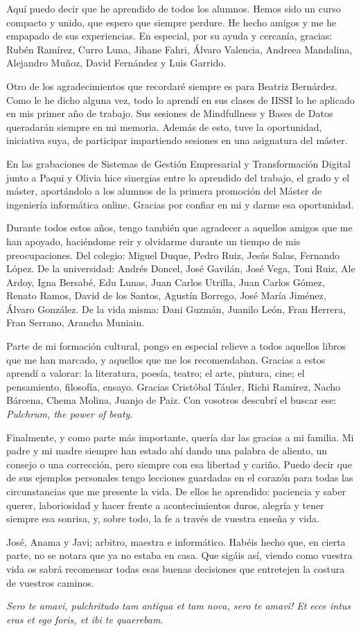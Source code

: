 Aquí puedo decir que he aprendido de todos los alumnos. Hemos sido un curso compacto y unido, que espero que siempre perdure. He hecho amigos y me he empapado de sus experiencias. En especial, por su ayuda y cercanía, gracias: Rubén Ramírez, Curro Luna, Jihane Fahri, Álvaro Valencia, Andreea Mandalina, Alejandro Muñoz, David Fernández y Luis Garrido.

Otro de los agradecimientos que recordaré siempre es para Beatriz Bernárdez. Como le he dicho alguna vez, todo lo aprendí en sus clases de IISSI lo he aplicado en mis primer año de trabajo. Sus sesiones de Mindfullness y Bases de Datos queradarán siempre en mi memoria. Además de esto, tuve la oportunidad, iniciativa suya, de participar impartiendo sesiones en una asignatura del máster.

En las grabaciones de Sistemas de Gestión Empresarial y Transformación Digital junto a Paqui y Olivia hice sinergias entre lo aprendido del trabajo, el grado y el máster, aportándolo a los alumnos de la primera promoción del Máster de ingeniería informática online. Gracias por confiar en mi y darme esa oportunidad.

Durante todos estos años, tengo también que agradecer a aquellos amigos que me han apoyado, haciéndome reir y olvidarme durante un tiempo de mis preocupaciones. Del colegio: Miguel Duque, Pedro Ruiz, Jesús Salas, Fernando López. De la universidad: Andrés Doncel, José Gavilán, José Vega, Toni Ruiz, Ale Ardoy, Igna Bersabé, Edu Lunas, Juan Carlos Utrilla, Juan Carlos Gómez, Renato Ramos, David de los Santos, Agustín Borrego, José María Jiménez, Álvaro González. De la vida misma: Dani Guzmán, Juanilo León, Fran Herrera, Fran Serrano, Arancha Muniain.

Parte de mi formación cultural, pongo en especial relieve a todos aquellos libros que me han marcado, y aquellos que me los recomendaban. Gracias a estos aprendí a valorar: la literatura, poesía, teatro; el arte, pintura, cine; el pensamiento, filosofía, ensayo. Gracias Cristóbal Táuler, Richi Ramírez, Nacho Bárcena, Chema Molina, Juanjo de Paiz. Con vosotros descubrí el buscar ese: \textit{Pulchrum, the power of beaty}.

Finalmente, y como parte más importante, quería dar las gracias a mi familia. Mi padre y mi madre siempre han estado ahí dando una palabra de aliento, un consejo o una corrección, pero siempre con esa libertad y cariño. Puedo decir que de sus ejemplos personales tengo lecciones guardadas en el corazón para todas las circunstancias que me presente la vida. De ellos he aprendido: paciencia y saber querer, laboriosidad y hacer frente a acontecimientos duros, alegría y tener siempre esa sonrisa, y, sobre todo, la fe a través de vuestra enseña y vida.

José, Anama y Javi; arbitro, maestra e informático. Habéis hecho que, en cierta parte, no se notara que ya no estaba en casa. Que sigáis así, viendo como vuestra vida os sabrá recomensar todas esas buenas decisiones que entretejen la costura de vuestros caminos.

\hfill \break
\hfill \textit{Sero te amavi, pulchritudo tam antiqua et tam nova, sero te amavi! Et ecce intus eras et ego foris, et ibi te quaerebam}.
